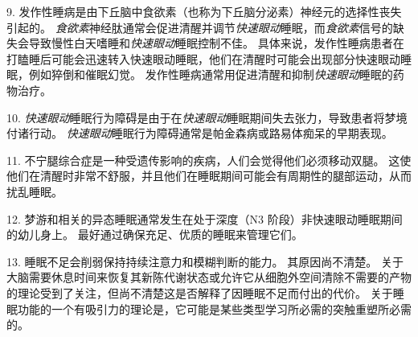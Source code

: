 9. 发作性睡病是由下丘脑中食欲素（也称为下丘脑分泌素）神经元的选择性丧失引起的。
\textit{食欲素}神经肽通常会促进清醒并调节\textit{快速眼动}睡眠，而\textit{食欲素}信号的缺失会导致慢性白天嗜睡和\textit{快速眼动}睡眠控制不佳。
具体来说，发作性睡病患者在打瞌睡后可能会迅速转入快速眼动睡眠，他们在清醒时可能会出现部分快速眼动睡眠，例如猝倒和催眠幻觉。
发作性睡病通常用促进清醒和抑制\textit{快速眼动}睡眠的药物治疗。


10. \textit{快速眼动}睡眠行为障碍是由于在\textit{快速眼动}睡眠期间失去张力，导致患者将梦境付诸行动。
\textit{快速眼动}睡眠行为障碍通常是帕金森病或路易体痴呆的早期表现。


11. 不宁腿综合症是一种受遗传影响的疾病，人们会觉得他们必须移动双腿。
这使他们在清醒时非常不舒服，并且他们在睡眠期间可能会有周期性的腿部运动，从而扰乱睡眠。


12. 梦游和相关的异态睡眠通常发生在处于深度（N3 阶段）非快速眼动睡眠期间的幼儿身上。
最好通过确保充足、优质的睡眠来管理它们。


13. 睡眠不足会削弱保持持续注意力和模糊判断的能力。
其原因尚不清楚。
关于大脑需要休息时间来恢复其新陈代谢状态或允许它从细胞外空间清除不需要的产物的理论受到了关注，但尚不清楚这是否解释了因睡眠不足而付出的代价。
关于睡眠功能的一个有吸引力的理论是，它可能是某些类型学习所必需的突触重塑所必需的。


